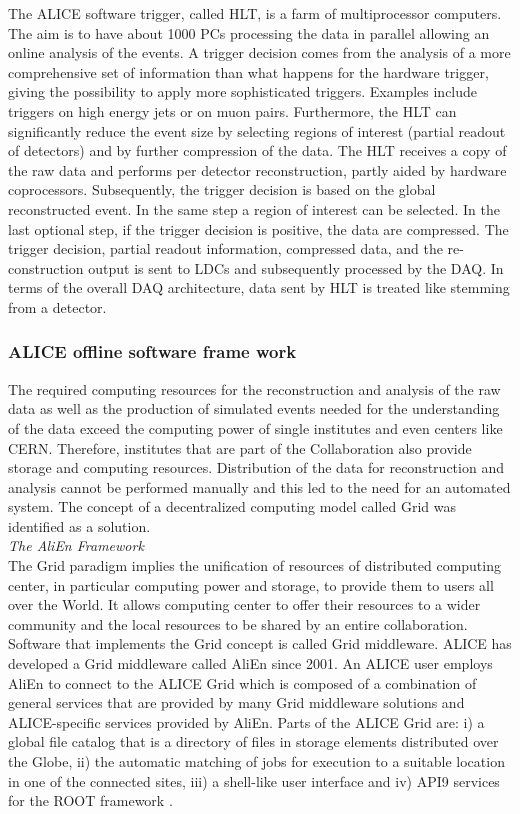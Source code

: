 The ALICE software trigger, called HLT, is a farm of multiprocessor computers. The aim is to have about 1000 PCs processing the data in parallel allowing an online analysis of the events. A trigger decision comes from the analysis of a more comprehensive set of information than what happens for the hardware trigger, giving the possibility to apply more sophisticated triggers. Examples include triggers on high energy jets or on muon pairs. Furthermore, the HLT can significantly reduce the event size by selecting regions of interest (partial readout of detectors) and by further compression of the data. The HLT receives a copy of the raw data and performs per detector reconstruction, partly aided by hardware coprocessors. Subsequently, the trigger decision is based on the global reconstructed event. In the same step a region of interest can be selected. In the last optional step, if the trigger decision is positive, the data are compressed. The trigger decision, partial readout information, compressed data, and the re- construction output is sent to LDCs and subsequently processed by the DAQ. In terms of the overall DAQ architecture, data sent by HLT is treated like stemming from a detector.

\newpage
\subsubsection{ALICE offline software frame work}\label{label:alicesw}
The required computing resources for the reconstruction and analysis of the raw data as well as the production of simulated events needed for the understanding of the data exceed the computing power of single institutes and even centers like CERN. Therefore, institutes that are part of the Collaboration also provide storage and computing resources. Distribution of the data for reconstruction and analysis cannot be performed manually and this led to the need for an automated system. The concept of a decentralized computing model called Grid \cite{cite:grid} was identified as a solution.\\


{\Large\textsl{The AliEn Framework}}\\
The Grid paradigm implies the unification of resources of distributed computing center, in particular computing power and storage, to provide them to users all over the World. It allows computing center to offer their resources to a wider community and the local resources to be shared by an entire collaboration.
Software that implements the Grid concept is called Grid middleware. ALICE has developed a Grid middleware called AliEn \cite{cite:alien} since 2001. An ALICE user employs AliEn to connect to the ALICE Grid which is composed of a combination of general services that are provided by many Grid middleware solutions and ALICE-specific services provided by AliEn. Parts of the ALICE Grid are: i) a global file catalog that is a directory of files in storage elements distributed over the Globe, ii) the automatic matching of jobs for execution to a suitable location in one of the connected sites, iii) a shell-like user interface and iv) API9 services for the ROOT framework \cite{cite:aliroot}.\\



